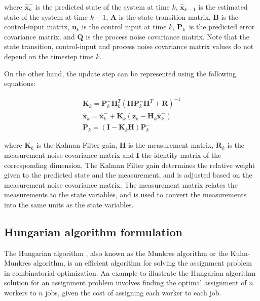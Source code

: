 where $\hat{\mathbf{x}}_k^-$ is the predicted state of the system at time $k$, $\hat{\mathbf{x}}_{k-1}$ is the estimated state of the system at time $k-1$, $\mathbf{A}$ is the state transition matrix, $\mathbf{B}$ is the control-input matrix, $\mathbf{u}_k$ is the control input at time $k$, $\mathbf{P}_k^-$ is the predicted error covariance matrix, and $\mathbf{Q}$ is the process noise covariance matrix. Note that the state transition, control-input and process noise covariance matrix values do not depend on the timestep time $k$.

On the other hand, the update step can be represented using the following equations:

\begin{equation}
	\begin{split}
		\mathbf{K}_k = \mathbf{P}_k^- \mathbf{H}_k^T (\mathbf{H} \mathbf{P}_k^- \mathbf{H}^T + \mathbf{R})^{-1} \\
		\hat{\mathbf{x}}_k = \hat{\mathbf{x}}_k^- + \mathbf{K}_k (\mathbf{z}_k - \mathbf{H}_k \hat{\mathbf{x}}_k^-) \\
		\mathbf{P}_k = (\mathbf{I} - \mathbf{K}_k \mathbf{H}) \mathbf{P}_k^-
	\end{split}
\end{equation}

where $\mathbf{K}_k$ is the Kalman Filter gain, $\mathbf{H}$ is the measurement matrix, $\mathbf{R}_k$ is the measurement noise covariance matrix and $\mathbf{I}$ the identity matrix of the corresponding dimension. The Kalman Filter gain determines the relative weight given to the predicted state and the measurement, and is adjusted based on the measurement noise covariance matrix. The measurement matrix relates the measurements to the state variables, and is used to convert the measurements into the same units as the state variables.

\subsection{Hungarian algorithm formulation}
\label{subsec:3_HA_formulation}

The Hungarian algorithm \cite{kuhn1955hungarian}, also known as the Munkres algorithm or the Kuhn-Munkres algorithm, is an efficient algorithm for solving the assignment problem in combinatorial optimization. An example to illustrate the Hungarian algorithm solution for an assignment problem involves finding the optimal assignment of $n$ workers to $n$ jobs, given the cost of assigning each worker to each job.

